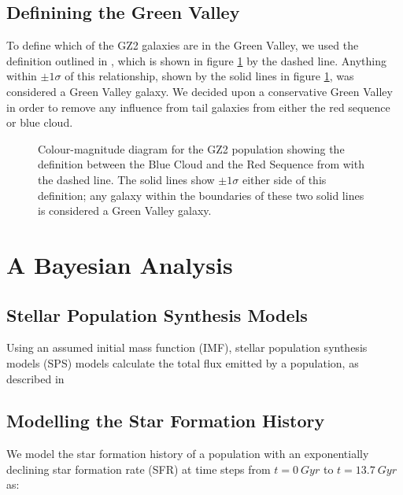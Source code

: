 \documentclass{mn2e}
\begin{document}
\subsection{Definining the Green Valley}
To define which of the GZ2 galaxies are in the Green Valley, we used the definition outlined in \citet{Baldry}, which is shown in figure \ref{CMGV} by the dashed line. Anything within $\pm 1\sigma$ of this relationship, shown by the solid lines in figure \ref{CMGV}, was considered a Green Valley galaxy. We decided upon a conservative Green Valley in order to remove any influence from tail galaxies from either the red sequence or blue cloud.

\begin{figure}
\caption{Colour-magnitude diagram for the GZ2 population showing the definition between the Blue Cloud and the Red Sequence from \citet{Baldry} with the dashed line. The solid lines show $\pm 1\sigma$ either side of this definition; any galaxy within the boundaries of these two solid lines is considered a Green Valley galaxy.}
\label{CMGV}
\end{figure}

\section{A Bayesian Analysis}\label{models}
\subsection{Stellar Population Synthesis Models}
Using an assumed initial mass function (IMF),  stellar population synthesis models (SPS) models calculate the total flux emitted by a population, as described in \cite{BC03}

\subsection{Modelling the Star Formation History}\label{sfh}
We model the star formation history of a population with an exponentially declining star formation rate (SFR) at time steps from $t =0 ~Gyr$ to $t=13.7 ~Gyr$ as:
\end{document}

